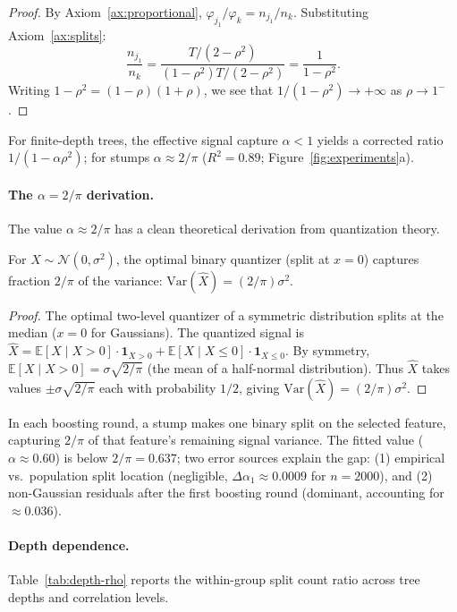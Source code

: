\documentclass{jmlr}
\newcommand{\E}{\mathbb{E}}
\newcommand{\Var}{\mathrm{Var}}
\begin{document}
\begin{proof}
By Axiom~\ref{ax:proportional}, $\varphi_{j_1}/\varphi_k = n_{j_1}/n_k$.
Substituting Axiom~\ref{ax:splits}:
\[
    \frac{n_{j_1}}{n_k} = \frac{T/(2-\rho^2)}{(1-\rho^2)T/(2-\rho^2)} = \frac{1}{1-\rho^2}.
\]
Writing $1-\rho^2 = (1-\rho)(1+\rho)$, we see that $1/(1-\rho^2) \to +\infty$ as $\rho \to 1^-$.
\end{proof}

For finite-depth trees, the effective signal capture $\alpha < 1$ yields a corrected ratio $1/(1{-}\alpha\rho^2)$; for stumps $\alpha \approx 2/\pi$ ($R^2{=}0.89$; Figure~\ref{fig:experiments}a).

\paragraph{The $\alpha = 2/\pi$ derivation.}
The value $\alpha \approx 2/\pi$ has a clean theoretical derivation from quantization theory.

\begin{proposition}
For $X \sim \mathcal{N}(0, \sigma^2)$, the optimal binary quantizer (split at $x = 0$) captures fraction $2/\pi$ of the variance: $\Var(\hat{X}) = (2/\pi)\sigma^2$.
\end{proposition}

\begin{proof}
The optimal two-level quantizer of a symmetric distribution splits at the median ($x = 0$ for Gaussians). The quantized signal is $\hat{X} = \E[X \mid X > 0] \cdot \mathbf{1}_{X > 0} + \E[X \mid X \leq 0] \cdot \mathbf{1}_{X \leq 0}$. By symmetry, $\E[X \mid X > 0] = \sigma\sqrt{2/\pi}$ (the mean of a half-normal distribution). Thus $\hat{X}$ takes values $\pm\sigma\sqrt{2/\pi}$ each with probability $1/2$, giving $\Var(\hat{X}) = (2/\pi)\sigma^2$.
\end{proof}

In each boosting round, a stump makes one binary split on the selected feature, capturing $2/\pi$ of that feature's remaining signal variance. The fitted value ($\alpha \approx 0.60$) is below $2/\pi = 0.637$; two error sources explain the gap: (1) empirical vs.\ population split location (negligible, $\Delta\alpha_1 \approx 0.0009$ for $n = 2000$), and (2) non-Gaussian residuals after the first boosting round (dominant, accounting for $\approx 0.036$).

\paragraph{Depth dependence.}
Table~\ref{tab:depth-rho} reports the within-group split count ratio across tree depths and correlation levels.
\end{document}
